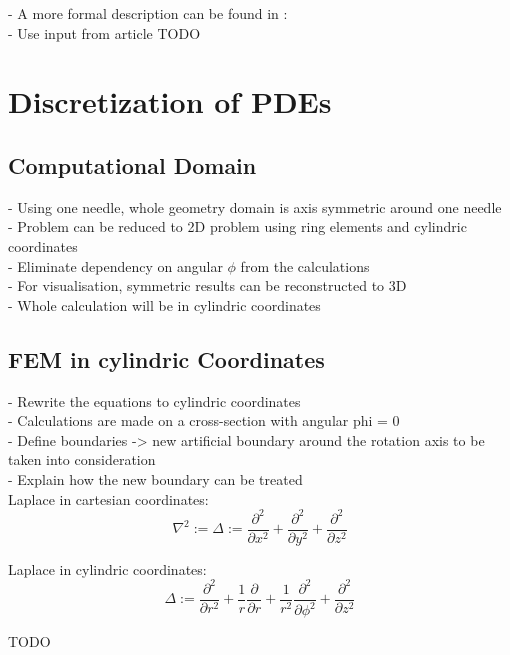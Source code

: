 \documentclass[parskip=half, titlepage=yes, 12pt, BCOR=12mm, DIV=calc]{scrartcl}
\begin{document}
- A more formal description can be found in : \\
- Use input from article TODO \\


\section{Discretization of PDEs}

\subsection{Computational Domain}
- Using one needle, whole geometry domain is axis symmetric around one needle \\
- Problem can be reduced to 2D problem using ring elements and cylindric coordinates \\
- Eliminate dependency on angular $\phi$ from the calculations \\
- For visualisation, symmetric results can be reconstructed to 3D \\
- Whole calculation will be in cylindric coordinates \\

\subsection{FEM in cylindric Coordinates}
- Rewrite the equations to cylindric coordinates \\
- Calculations are made on a cross-section with angular phi = 0 \\
- Define boundaries -> new artificial boundary around the rotation axis to be taken into consideration \\
- Explain how the new boundary can be treated \\
 
Laplace in cartesian coordinates:
\begin{equation}
    \nabla^2 := \Delta := \frac{\partial^2}{\partial x^2} + \frac{\partial^2}{\partial y^2} + \frac{\partial^2}{\partial z^2}
\end{equation}

Laplace in cylindric coordinates:
\begin{equation}
    \Delta := \frac{\partial^2}{\partial r^2} + \frac{1}{r} \frac{\partial}{\partial r} + \frac{1}{r^2} \frac{\partial^2}{\partial \phi^2} + \frac{\partial^2}{\partial z^2}
\end{equation}

TODO \\
\end{document}
